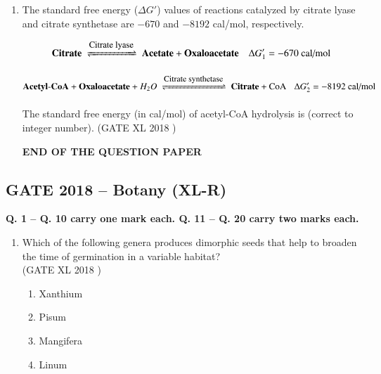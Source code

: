 \documentclass[14pt]{extarticle}
\begin{document}
\begin{flushleft}
\begin{enumerate}[leftmargin=*]
\item The standard free energy ($\Delta G'$) values of reactions catalyzed by citrate lyase and citrate synthetase are $-670$ and $-8192$ cal/mol, respectively.

\[
\mathbf{Citrate}
\ \xrightleftharpoons[\text{}]{\text{\small Citrate lyase}}\
\mathbf{Acetate} + \mathbf{Oxaloacetate}
\quad \Delta G'_1 = -670 \ \text{cal/mol}
\]

\[
\mathbf{Acetyl\mbox{-}CoA} + \mathbf{Oxaloacetate} + H_2O
\ \xrightleftharpoons[\text{}]{\text{\small Citrate synthetase}}\
\mathbf{Citrate} + \mathrm{CoA}
\hspace{0.3cm} \Delta G'_2 = -8192 \ \text{cal/mol}
\]

The standard free energy (in cal/mol) of acetyl-CoA hydrolysis is \underline{\hspace{2cm}} (correct to integer number).
\hfill(GATE XL 2018 )\\

\begin{center}
\textbf{END OF THE QUESTION PAPER}
\end{center}

\end{enumerate}
\clearpage



\begin{center}   
\section*{GATE 2018 – Botany (XL-R)}
\noindent\textbf{Q. 1 -- Q. 10 carry one mark each. Q. 11 -- Q. 20 carry two marks each.}
\end{center}
\begin{enumerate}[leftmargin=*]
 \item Which of the following genera produces dimorphic seeds that help to broaden the time of germination in a variable habitat?\\
 \hfill(GATE XL 2018 )
    \begin{multicols}{2}
    \begin{enumerate}[label=(\Alph*)]
        \item Xanthium
        \item Pisum
        \item Mangifera
        \item Linum
    \end{enumerate}
    \end{multicols}


\end{enumerate}
\end{flushleft}
\end{document}
